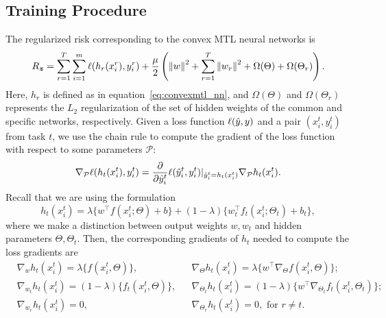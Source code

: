 %
\subsection{Training Procedure}
The regularized risk corresponding to the convex MTL neural networks is
\begin{equation}
    \label{eq:regrisk_convex_nn}
    \begin{aligned}
        \risk_{\bsample} = \sum_{r=1}^\ntasks \sum_{i=1}^{m} \lossf(h_r(x_i^r), y_i^r) + \frac{\mu}{2} \left( \norm{w}^2 + \sum_{r=1}^\ntasks \norm{w_r}^2 + \Omega(\Theta) + \Omega(\Theta_r)\right) .
    \end{aligned}
\end{equation}
Here, $h_r$ is defined as in equation~\eqref{eq:convexmtl_nn}, and $\Omega(\Theta)$ and $\Omega(\Theta_r)$ represents the $L_2$ regularization of the set of hidden weights of the common and specific networks, respectively.
Given a loss function $\ell(\hat{y}, y)$ and a pair $(x_i^t, y_i^t)$ from task $t$, we use the chain rule to compute the gradient of the loss function with respect to some parameters $\mathcal{P}$:
\begin{equation}\label{eq:gradient_p}
    \nabla_\mathcal{P} \lossf(h_t(x_i^t), y_i^t) = 
    \frac{\partial}{\partial \hat{y}_i^t} \lossf(\hat{y}_i^t, y_i^t) \vert_{\hat{y}_i^t = h_t(x_i^t)} \nabla_\mathcal{P} h_t(x_i^t) .
\end{equation}
Recall that we are using the formulation 
$$h_t(x_i^t)
= \lambda \lbrace w^\intercal f(x_i^t; \Theta) + b \rbrace + (1 - \lambda) \lbrace w_t^\intercal f_t(x_i^t; \Theta_t) + b_t \rbrace, $$
where we make a distinction between output weights $w, w_t$ and hidden parameters $\Theta, \Theta_t$.
Then, the corresponding gradients of $h_t$ needed to compute the loss gradients are
\begin{equation}\label{eq:gradients_losses} 
    \begin{aligned}       
        &\nabla_{w} h_t(x_i^t)  
        = \lambda \lbrace f(x_i^t, \Theta) \rbrace ,
        &&\nabla_{\Theta} h_t(x_i^t)  
        = \lambda \lbrace w^\intercal \nabla_\Theta f(x_i^t, \Theta)\rbrace ; \\
        &\nabla_{w_t} h_t(x_i^t)  
        = (1 - \lambda) \lbrace f_t(x_i^t, \Theta) \rbrace ,
        &&\nabla_{\Theta_t} h_t(x_i^t)  
        = (1 - \lambda) \lbrace  w^\intercal \nabla_{\Theta_t} f_t(x_i^t, \Theta_t)\rbrace ; \\
        &\nabla_{w_r} h_t(x_i^t)  
        =  0 , 
        &&\nabla_{\Theta_r} h_t(x_i^t)  
        =  0 , \text{ for } r \neq t .\\
    \end{aligned}    
\end{equation}
